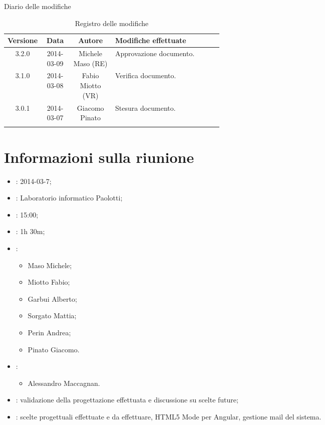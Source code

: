 
\newpage
Diario delle modifiche
\begin{center}
\begin{longtable}{|c|c|c|p{0.5\linewidth}|}
\toprule
\textbf{Versione} & \textbf{Data} & \textbf{Autore} & \textbf{Modifiche effettuate}\\

\midrule
3.2.0 & 2014-03-09 & Michele Maso (RE)  & Approvazione documento.\\
\midrule
3.1.0 & 2014-03-08 & Fabio Miotto (VR) & Verifica documento.\\
\midrule
3.0.1 & 2014-03-07 & Giacomo Pinato & Stesura documento.\\

\bottomrule
\caption{Registro delle modifiche}
\label{tab:changelog}
\end{longtable}
\end{center}

\newpage
\tableofcontents


\newpage
\section{Informazioni sulla riunione}%
\label{1.0}
\begin{itemize}
\item {}: 2014-03-7;
\item {}: Laboratorio informatico Paolotti;
\item {}: 15:00;
\item {}: 1h 30m;
\item {}: \NomeGruppo{}
\begin{itemize}
\item Maso Michele;
\item Miotto Fabio;
\item Garbui Alberto;
\item Sorgato Mattia;
\item Perin Andrea;
\item Pinato Giacomo.
\end{itemize}
\item {}:
\begin{itemize}
\item Alessandro Maccagnan.
\end{itemize}
\item {}: validazione della progettazione effettuata e discussione su scelte future;
\item {}: scelte progettuali effettuate e da effettuare, HTML5 Mode per Angular, gestione mail del sistema.
\end{itemize}

